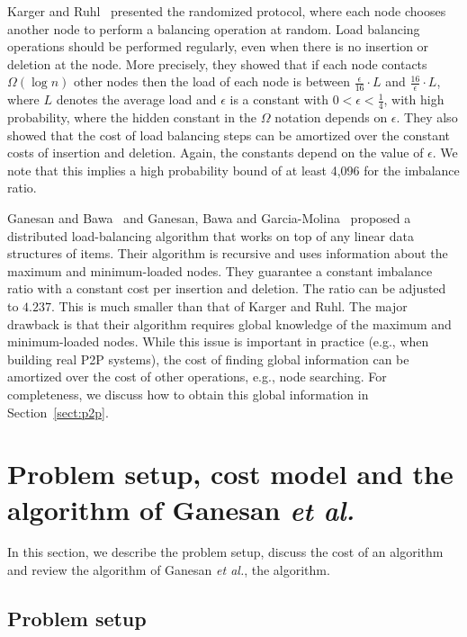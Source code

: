 \documentclass[a4paper]{article}
\begin{document}
Karger and Ruhl~\cite{Karger03newalgorithms, Karger04simpleefficient} 
presented the randomized protocol, where each node chooses another node 
to perform a balancing operation at random.  Load balancing operations
should be performed regularly, even when there is no insertion or deletion
at the node.  More precisely, they showed that if each node contacts $\Omega(\log n)$ 
other nodes then the load of each node is between $\frac{\epsilon}{16}\cdot L$ and 
$\frac{16}{\epsilon}\cdot L$, where $L$ denotes the average load and $\epsilon$ is a 
constant with $0 < \epsilon < \frac{1}{4}$, with high probability, where the hidden constant
in the $\Omega$ notation depends on $\epsilon$.  They also showed that
the cost of load balancing steps can be amortized over the constant costs of 
insertion and deletion.  Again, the constants depend on the value of $\epsilon$.
We note that this implies a high probability bound of at least 4,096 for the imbalance ratio.


Ganesan and Bawa~\cite{Ganesan03} and Ganesan, Bawa and
Garcia-Molina~\cite{GanesanBGM04-vldb} proposed a distributed
load-balancing algorithm that works on top of any linear data
structures of items. Their algorithm is recursive and uses 
information about the maximum and minimum-loaded nodes.  They guarantee a
constant imbalance ratio with a constant cost per insertion and
deletion.  The ratio can be adjusted to $4.237$.  This is much smaller
than that of Karger and Ruhl.  The major drawback is that their
algorithm requires  global knowledge of the maximum and 
minimum-loaded nodes.  
While this issue is important in practice (e.g., when building 
real P2P systems), the cost of finding global information 
can be amortized over the cost of other operations, e.g., node searching.
For completeness, we discuss how to obtain this global information in
Section~\ref{sect:p2p}.

\section{Problem setup, cost model and the algorithm of Ganesan {\em
    et al.}}
\label{sect:model}

In this section, we describe the problem setup, discuss the cost of an
algorithm and review the algorithm of Ganesan {\em et al.}, the
{\adjload} algorithm.

\subsection{Problem setup}
\end{document}
